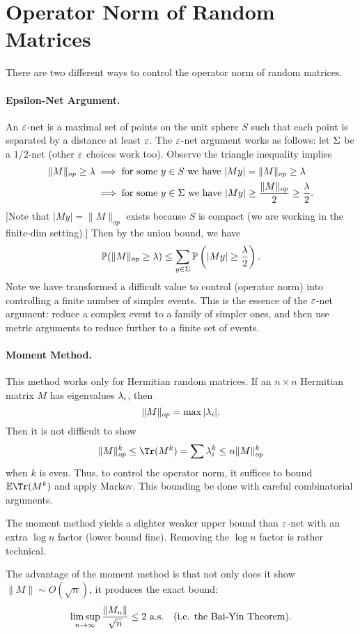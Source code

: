 \section{Operator Norm of Random Matrices}

There are two different ways to control the operator norm of random matrices.

\paragraph{Epsilon-Net Argument.} An $\e$-net is a maximal set of points on the unit sphere $S$ such that each point is separated by a distance at least $\e$. The $\e$-net argument works as follows: let $\S$ be a $1/2$-net (other $\e$ choices work too). Observe the triangle inequality implies
\[
    \begin{split}
        \|M\|_{op} \ge \l & \implies \text{for some $y \in S$ we have } |My| = \|M\|_{op} \ge \l                       \\
                          & \implies \text{for some $y \in \S$ we have } |My| \ge \frac{\|M\|_{op}}{2} \ge \frac{\l}{2}. \\
    \end{split}
\]
[Note that $|My| = \|M\|_{op}$ exists because $S$ is compact (we are working in the finite-dim setting).] Then by the union bound, we have
\[
    \bP(\|M\|_{op} \ge \l) \le \sum_{y \in \S} \bP\left(|My| \ge \frac{\l}{2}\right).
\]
Note we have transformed a difficult value to control (operator norm) into controlling a finite number of simpler events. This is the essence of the $\e$-net argument: reduce a complex event to a family of simpler ones, and then use metric arguments to reduce further to a finite set of events.

\paragraph{Moment Method.} This method works only for Hermitian random matrices. If an $n \times n$ Hermitian matrix $M$ has eigenvalues $\l_i$, then
\[
    \|M\|_{op} = \max |\l_i|.
\]
Then it is not difficult to show
\[
    \|M\|^k_{op} \leq \Tr(M^k) = \sum \l_i^k \leq n\|M\|^k_{op}
\]
when $k$ is even. Thus, to control the operator norm, it suffices to bound $\bE \Tr(M^k)$ and apply Markov. This bounding be done with careful combinatorial arguments.

The moment method yields a slighter weaker upper bound than $\e$-net with an extra $\log n$ factor (lower bound fine). Removing the $\log n$ factor is rather technical.

The advantage of the moment method is that not only does it show $\|M\| \sim O(\sqrt{n})$, it produces the exact bound:
\[
    \limsup_{n \to \i} \frac{\|M_n\|}{\sqrt{n}} \le 2 \ \text{a.s.} \quad (\text{i.e. the Bai-Yin Theorem}).
\]

